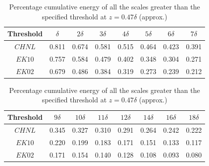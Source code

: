 \documentclass{amsart}
\begin{document}
\noindent  

\begin{table}[!htb]
\centering
\caption{Percentage cumulative energy of all the scales greater than the specified threshold at $z=0.47\delta$ (approx.)}
\begin{tabular*}{0.9\textwidth}{ c@{\hskip 0.35in} c@{\hskip 0.35in} c@{\hskip 0.35in} c@{\hskip 0.35in} c@{\hskip 0.35in} c@{\hskip 0.35in} c@{\hskip 0.3in} c@{\hskip 0.3in} }
\hline
\hline
 Threshold & $\delta$ & $2\delta$ & $3\delta$ & $4\delta$ & $5\delta$ & $6\delta$  & $7\delta$  \\ %
\hline 
$CHNL$ & 0.811 & 0.674 & 0.581 & 0.515 & 0.464 & 0.423 &  0.391  \\ %
$EK10$ & 0.757 & 0.584 & 0.479 & 0.402 & 0.348 & 0.304 & 0.271   \\ %
$EK02$ & 0.679 & 0.486 & 0.384 & 0.319 & 0.273 & 0.239 & 0.212   \\ %
\end{tabular*}
\label{tab:prcnt_cum_energy}
%
\begin{tabular*}{0.9\textwidth}{c@{\hskip 0.35in} c@{\hskip 0.35in} c@{\hskip 0.35in} c@{\hskip 0.35in} c@{\hskip 0.350in} c@{\hskip 0.350in}  c@{\hskip 0.35in} c}
\hline

 Threshold & $9\delta$& $10\delta$ & $11\delta$ & $12\delta$ & $14\delta$ & $16\delta$ & $18\delta$ \\
\hline 
$CHNL$ & 0.345 & 0.327 & 0.310 & 0.291 & 0.264 & 0.242 & 0.222 \\
$EK10$ & 0.220 & 0.199 & 0.183  & 0.171 & 0.151 & 0.133 & 0.117 \\
$EK02$ & 0.171 & 0.154 & 0.140 & 0.128 & 0.108 & 0.093 & 0.080 \\
\hline 
\hline 
\end{tabular*}
\end{table}
\end{document}
